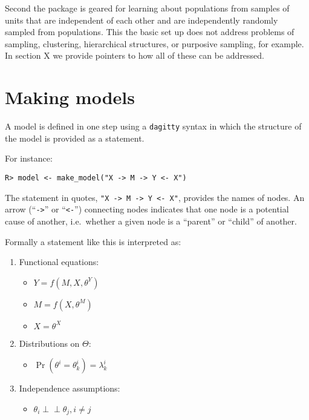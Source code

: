 \documentclass[
  11pt,
  article]{jss}
\providecommand{\tightlist}{%
  \setlength{\itemsep}{0pt}\setlength{\parskip}{0pt}}\usepackage{longtable,booktabs,array}
\begin{document}
Second the package is geared for learning about populations from samples
of units that are independent of each other and are independently
randomly sampled from populations. This the basic set up does not
address problems of sampling, clustering, hierarchical structures, or
purposive sampling, for example. In section X we provide pointers to how
all of these can be addressed.

\hypertarget{sec-models}{%
\section{Making models}\label{sec-models}}

A model is defined in one step using a \texttt{dagitty} syntax in which
the structure of the model is provided as a statement.

For instance:

\begin{verbatim}
R> model <- make_model("X -> M -> Y <- X")
\end{verbatim}

The statement in quotes,
\texttt{"X\ -\textgreater{}\ M\ -\textgreater{}\ Y\ \textless{}-\ X"},
provides the names of nodes. An arrow (``\texttt{-\textgreater{}}'' or
``\texttt{\textless{}-}'') connecting nodes indicates that one node is a
potential cause of another, i.e.~whether a given node is a ``parent'' or
``child'' of another.

Formally a statement like this is interpreted as:

\begin{enumerate}
\def\labelenumi{\arabic{enumi}.}
\item
  Functional equations:

  \begin{itemize}
  \tightlist
  \item
    \(Y = f(M, X, \theta^Y)\)
  \item
    \(M = f(X, \theta^M)\)
  \item
    \(X = \theta^X\)
  \end{itemize}
\item
  Distributions on \(\Theta\):

  \begin{itemize}
  \tightlist
  \item
    \(\Pr(\theta^i = \theta^i_k) = \lambda^i_k\)
  \end{itemize}
\item
  Independence assumptions:\\

  \begin{itemize}
  \tightlist
  \item
    \(\theta_i \perp\!\!\! \perp \theta_j, i\neq j\)
  \end{itemize}
\end{enumerate}
\end{document}
